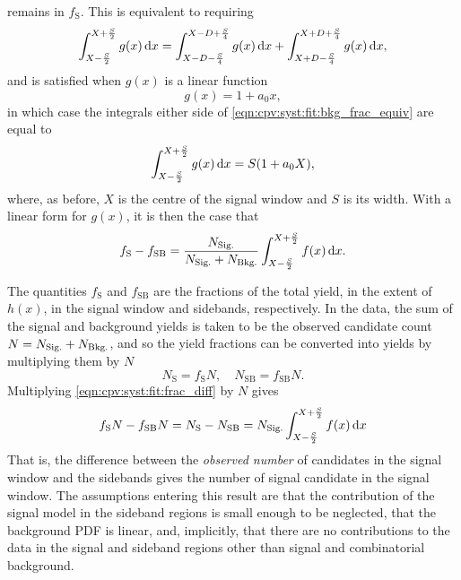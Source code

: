 remains in $f_{\text{S}}$.
This is equivalent to requiring
\begin{equation}
    \int_{X - \frac{S}{2}}^{X + \frac{S}{2}} g(x) \mathop{}\!\textnormal{d}{x}
    =
    \int_{X - D - \frac{S}{4}}^{X - D + \frac{S}{4}} g(x) \mathop{}\!\textnormal{d}{x} +
    \int_{X + D - \frac{S}{4}}^{X + D + \frac{S}{4}} g(x) \mathop{}\!\textnormal{d}{x},
  \label{eqn:cpv:syst:fit:bkg_frac_equiv}
\end{equation}
and is satisfied when $g(x)$ is a linear function
\begin{equation*}
  g(x) = 1 + a_{0}x,
\end{equation*}
in which case the integrals either side of 
\cref{eqn:cpv:syst:fit:bkg_frac_equiv} are equal to
\begin{equation}
    \int_{X - \frac{S}{2}}^{X + \frac{S}{2}} g(x) \mathop{}\!\textnormal{d}{x} =
      S(1 + a_{0}X),
\end{equation}
where, as before, $X$ is the centre of the signal window and $S$ is its width.
With a linear form for $g(x)$, it is then the case that
\begin{equation}
  f_{\text{S}} - f_{\text{SB}} = \frac{N_{\text{Sig.}}}{N_{\text{Sig.}} + N_{\text{Bkg.}}}
    \int_{X - \frac{S}{2}}^{X + \frac{S}{2}} f(x) \mathop{}\!\textnormal{d}{x}.
  \label{eqn:cpv:syst:fit:frac_diff}
\end{equation}

The quantities $f_{\text{S}}$ and $f_{\text{SB}}$ are the fractions of the 
total yield, in the extent of $h(x)$, in the signal window and sidebands, 
respectively.
In the data, the sum of the signal and background yields is taken to be the 
observed candidate count $N = N_{\text{Sig.}} + N_{\text{Bkg.}}$, and so the yield fractions can be 
converted into yields by multiplying them by $N$
\begin{equation}
  N_{\text{S}} = f_{\text{S}}N,\quad
  N_{\text{SB}} = f_{\text{SB}}N.
\end{equation}
Multiplying \cref{eqn:cpv:syst:fit:frac_diff} by $N$ gives
\begin{equation}
  f_{\text{S}}N - f_{\text{SB}}N =
    N_{\text{S}} - N_{\text{SB}} =
    N_{\text{Sig.}}
    \int_{X - \frac{S}{2}}^{X + \frac{S}{2}} f(x) \mathop{}\!\textnormal{d}{x}
  \label{eqn:cpv:syst:fit:yield_diff}
\end{equation}
That is, the difference between the \emph{observed number} of candidates in the 
signal window and the sidebands gives the number of signal candidate in the 
signal window.
The assumptions entering this result are that the contribution of the signal 
model in the sideband regions is small enough to be neglected, that the 
background \ac{PDF} is linear, and, implicitly, that there are no contributions 
to the data in the signal and sideband regions other than signal and 
combinatorial background.

